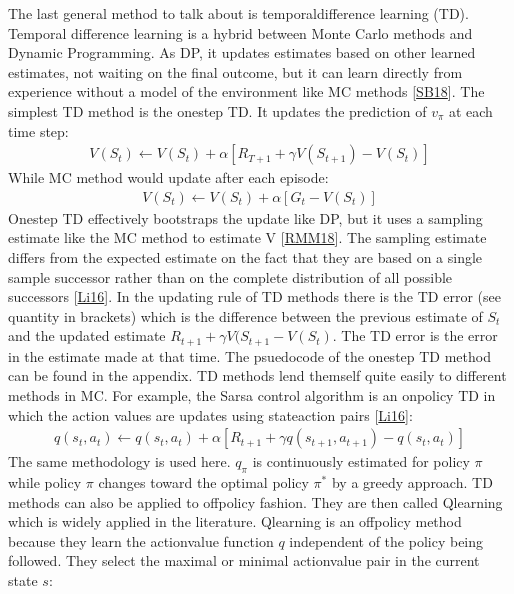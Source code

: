 \documentclass[letterpaper,10pt,english]{jupyterBook}
\begin{document}
\sphinxAtStartPar
The last general method to talk about is temporal\sphinxhyphen{}difference learning (TD). Temporal difference learning is a hybrid between Monte Carlo methods and Dynamic Programming. As DP, it updates estimates based on other learned estimates, not waiting on the final outcome, but it can learn directly from experience without a model of the environment like MC methods {[}\hyperlink{cite.Discussion:id70}{SB18}{]}. The simplest TD method is the one\sphinxhyphen{}step TD. It updates the prediction of \(v_{\pi}\) at each time step:
\begin{equation*}
\begin{split}V(S_t) \leftarrow V(S_t) + \alpha[R_{T+1} + \gamma V(S_{t+1}) - V(S_t)]\end{split}
\end{equation*}
\sphinxAtStartPar
While MC method would update after each episode:
\begin{equation*}
\begin{split} V(S_t) \leftarrow V(S_t) + \alpha[G_t - V(S_t)] \end{split}
\end{equation*}
\sphinxAtStartPar
One\sphinxhyphen{}step TD effectively bootstraps the update like DP, but it uses a sampling estimate like the MC method to estimate V {[}\hyperlink{cite.Discussion:id51}{RMM18}{]}. The sampling estimate differs from the expected estimate on the fact that they are based on a single sample successor rather than on the complete distribution of all possible successors {[}\hyperlink{cite.Discussion:id47}{Li16}{]}. In the updating rule of TD methods there is the TD error (see quantity in brackets) which is the difference between the previous estimate of \(S_t\) and the updated estimate  \(R_{t+1} + \gamma V(S_{t+1} - V(S_t)\). The TD error is the error in the estimate made at that time. The psuedocode of the one\sphinxhyphen{}step TD method can be found in the appendix. TD methods lend themself quite easily to different methods in MC. For example, the Sarsa control algorithm is an on\sphinxhyphen{}policy TD in which the action values are updates using state\sphinxhyphen{}action pairs {[}\hyperlink{cite.Discussion:id47}{Li16}{]}:
\begin{equation*}
\begin{split} q(s_t, a_t) \leftarrow q(s_t, a_t) + \alpha[R_{t+1} + \gamma q(s_{t+1}, a_{t+1}) - q(s_t, a_t)] \end{split}
\end{equation*}
\sphinxAtStartPar
The same methodology is used here. \(q_\pi\) is continuously estimated for policy \(\pi\) while policy \(\pi\) changes toward the optimal policy \(\pi^*\) by a greedy approach. TD methods can also be applied to off\sphinxhyphen{}policy fashion. They are then called Q\sphinxhyphen{}learning which is widely applied in the literature. Q\sphinxhyphen{}learning is an off\sphinxhyphen{}policy method because they learn the action\sphinxhyphen{}value function \(q\) independent of the policy being followed. They select the maximal or minimal action\sphinxhyphen{}value pair in the current state \(s\):
\end{document}
